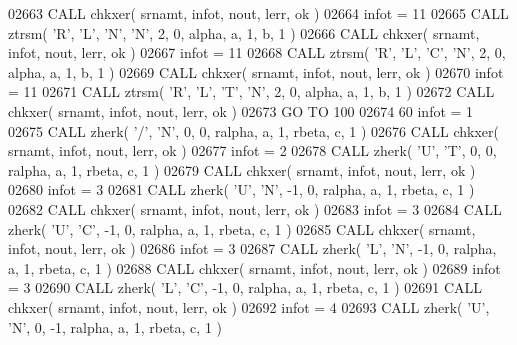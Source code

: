 \begin{DoxyCode}
02663       \textcolor{keyword}{CALL }chkxer( srnamt, infot, nout, lerr, ok )
02664       infot = 11
02665       \textcolor{keyword}{CALL }ztrsm( \textcolor{stringliteral}{'R'}, \textcolor{stringliteral}{'L'}, \textcolor{stringliteral}{'N'}, \textcolor{stringliteral}{'N'}, 2, 0, alpha, a, 1, b, 1 )
02666       \textcolor{keyword}{CALL }chkxer( srnamt, infot, nout, lerr, ok )
02667       infot = 11
02668       \textcolor{keyword}{CALL }ztrsm( \textcolor{stringliteral}{'R'}, \textcolor{stringliteral}{'L'}, \textcolor{stringliteral}{'C'}, \textcolor{stringliteral}{'N'}, 2, 0, alpha, a, 1, b, 1 )
02669       \textcolor{keyword}{CALL }chkxer( srnamt, infot, nout, lerr, ok )
02670       infot = 11
02671       \textcolor{keyword}{CALL }ztrsm( \textcolor{stringliteral}{'R'}, \textcolor{stringliteral}{'L'}, \textcolor{stringliteral}{'T'}, \textcolor{stringliteral}{'N'}, 2, 0, alpha, a, 1, b, 1 )
02672       \textcolor{keyword}{CALL }chkxer( srnamt, infot, nout, lerr, ok )
02673       \textcolor{keywordflow}{GO TO} 100
02674    60 infot = 1
02675       \textcolor{keyword}{CALL }zherk( \textcolor{stringliteral}{'/'}, \textcolor{stringliteral}{'N'}, 0, 0, ralpha, a, 1, rbeta, c, 1 )
02676       \textcolor{keyword}{CALL }chkxer( srnamt, infot, nout, lerr, ok )
02677       infot = 2
02678       \textcolor{keyword}{CALL }zherk( \textcolor{stringliteral}{'U'}, \textcolor{stringliteral}{'T'}, 0, 0, ralpha, a, 1, rbeta, c, 1 )
02679       \textcolor{keyword}{CALL }chkxer( srnamt, infot, nout, lerr, ok )
02680       infot = 3
02681       \textcolor{keyword}{CALL }zherk( \textcolor{stringliteral}{'U'}, \textcolor{stringliteral}{'N'}, -1, 0, ralpha, a, 1, rbeta, c, 1 )
02682       \textcolor{keyword}{CALL }chkxer( srnamt, infot, nout, lerr, ok )
02683       infot = 3
02684       \textcolor{keyword}{CALL }zherk( \textcolor{stringliteral}{'U'}, \textcolor{stringliteral}{'C'}, -1, 0, ralpha, a, 1, rbeta, c, 1 )
02685       \textcolor{keyword}{CALL }chkxer( srnamt, infot, nout, lerr, ok )
02686       infot = 3
02687       \textcolor{keyword}{CALL }zherk( \textcolor{stringliteral}{'L'}, \textcolor{stringliteral}{'N'}, -1, 0, ralpha, a, 1, rbeta, c, 1 )
02688       \textcolor{keyword}{CALL }chkxer( srnamt, infot, nout, lerr, ok )
02689       infot = 3
02690       \textcolor{keyword}{CALL }zherk( \textcolor{stringliteral}{'L'}, \textcolor{stringliteral}{'C'}, -1, 0, ralpha, a, 1, rbeta, c, 1 )
02691       \textcolor{keyword}{CALL }chkxer( srnamt, infot, nout, lerr, ok )
02692       infot = 4
02693       \textcolor{keyword}{CALL }zherk( \textcolor{stringliteral}{'U'}, \textcolor{stringliteral}{'N'}, 0, -1, ralpha, a, 1, rbeta, c, 1 )

\end{DoxyCode}
